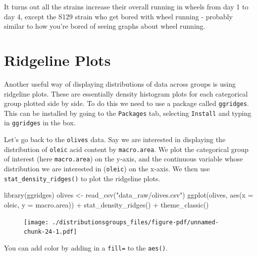 \documentclass[
  letterpaper,
  DIV=11,
  numbers=noendperiod]{scrreprt}
\newenvironment{Shaded}{\begin{snugshade}}{\end{snugshade}}
\newcommand{\AttributeTok}[1]{\textcolor[rgb]{0.40,0.45,0.13}{#1}}
\newcommand{\FunctionTok}[1]{\textcolor[rgb]{0.28,0.35,0.67}{#1}}
\newcommand{\NormalTok}[1]{\textcolor[rgb]{0.00,0.23,0.31}{#1}}
\newcommand{\OtherTok}[1]{\textcolor[rgb]{0.00,0.23,0.31}{#1}}
\newcommand{\SpecialCharTok}[1]{\textcolor[rgb]{0.37,0.37,0.37}{#1}}
\newcommand{\StringTok}[1]{\textcolor[rgb]{0.13,0.47,0.30}{#1}}
\begin{document}
It turns out all the strains increase their overall running in wheels
from day 1 to day 4, except the S129 strain who get bored with wheel
running - probably similar to how you're bored of seeing graphs about
wheel running.

\hypertarget{ridgeline-plots}{%
\section{Ridgeline Plots}\label{ridgeline-plots}}

Another useful way of displaying distributions of data across groups is
using ridgeline plots. These are essentially density histogram plots for
each categorical group plotted side by side. To do this we need to use a
package called \texttt{ggridges}. This can be installed by going to the
\texttt{Packages} tab, selecting \texttt{Install} and typing in
\texttt{ggridges} in the box.

Let's go back to the \texttt{olives} data. Say we are interested in
displaying the distribution of \texttt{oleic} acid content by
\texttt{macro.area}. We plot the categorical group of interest (here
\texttt{macro.area}) on the y-axis, and the continuous variable whose
distribution we are interested in (\texttt{oleic}) on the x-axis. We
then use \texttt{stat\_density\_ridges()} to plot the ridgeline plots.

\begin{Shaded}
\begin{Highlighting}[]
\FunctionTok{library}\NormalTok{(ggridges)}
\NormalTok{olives }\OtherTok{\textless{}{-}} \FunctionTok{read\_csv}\NormalTok{(}\StringTok{"data\_raw/olives.csv"}\NormalTok{)}
\FunctionTok{ggplot}\NormalTok{(olives, }\FunctionTok{aes}\NormalTok{(}\AttributeTok{x =}\NormalTok{ oleic, }\AttributeTok{y =}\NormalTok{ macro.area)) }\SpecialCharTok{+}
  \FunctionTok{stat\_density\_ridges}\NormalTok{() }\SpecialCharTok{+}
  \FunctionTok{theme\_classic}\NormalTok{()}
\end{Highlighting}
\end{Shaded}

\begin{figure}[H]

{\centering \texttt{[image: ./distributionsgroups\_files/figure-pdf/unnamed-chunk-24-1.pdf]}

}

\end{figure}

You can add color by adding in a \texttt{fill=} to the \texttt{aes()}.
\end{document}
